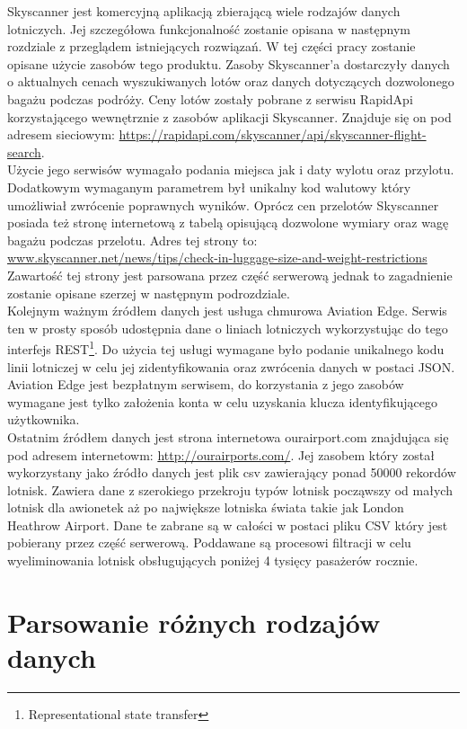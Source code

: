 \documentclass[12pt, twoside]{report}
\begin{document}
Skyscanner jest komercyjną aplikacją zbierającą wiele rodzajów danych lotniczych. Jej szczegółowa funkcjonalność zostanie opisana w następnym rozdziale z przeglądem istniejących rozwiązań. W tej części pracy zostanie opisane użycie zasobów tego produktu. Zasoby Skyscanner'a dostarczyły danych o aktualnych cenach wyszukiwanych lotów oraz danych dotyczących dozwolonego bagażu podczas podróży. Ceny lotów zostały pobrane z serwisu RapidApi korzystającego wewnętrznie z zasobów aplikacji Skyscanner. Znajduje się on pod adresem sieciowym: \url{https://rapidapi.com/skyscanner/api/skyscanner-flight-search}.\\
Użycie jego serwisów wymagało podania miejsca jak i daty wylotu oraz przylotu. Dodatkowym wymaganym parametrem był unikalny kod walutowy który umożliwiał zwrócenie poprawnych wyników. Oprócz cen przelotów Skyscanner posiada też stronę internetową z tabelą opisującą dozwolone wymiary oraz wagę bagażu podczas przelotu. Adres tej strony to: \url{www.skyscanner.net/news/tips/check-in-luggage-size-and-weight-restrictions}\\
Zawartość tej strony jest parsowana przez część serwerową jednak to zagadnienie zostanie opisane szerzej w następnym podrozdziale.\\ \indent
Kolejnym ważnym źródłem danych jest usługa chmurowa Aviation Edge. Serwis ten w prosty sposób udostępnia dane o liniach lotniczych wykorzystując do tego interfejs REST\footnote{Representational state transfer}. Do użycia tej usługi wymagane było podanie unikalnego kodu linii lotniczej w celu jej zidentyfikowania oraz zwrócenia danych w postaci JSON. Aviation Edge jest bezpłatnym serwisem, do korzystania z jego zasobów wymagane jest tylko założenia konta w celu uzyskania klucza identyfikującego użytkownika. \\ \indent
Ostatnim źródłem danych jest strona internetowa ourairport.com znajdująca się pod adresem internetowm: \url{http://ourairports.com/}. Jej zasobem który został wykorzystany jako źródło danych jest plik csv zawierający ponad 50000 rekordów lotnisk. Zawiera dane z szerokiego przekroju typów lotnisk począwszy od małych lotnisk dla awionetek aż po największe lotniska świata takie jak London Heathrow Airport. Dane te zabrane są w całości w postaci pliku CSV który jest pobierany przez część serwerową. Poddawane są procesowi filtracji w celu wyeliminowania lotnisk obsługujących poniżej 4 tysięcy pasażerów rocznie.




\newpage
\section{Parsowanie różnych rodzajów danych}
\end{document}
